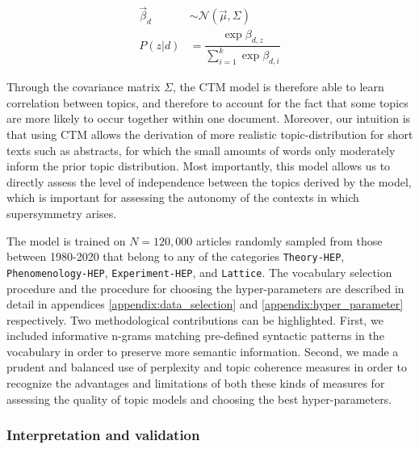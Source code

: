\documentclass[smallextended]{svjour3}
\begin{document}
\begin{align}
    \label{eq:ctm_prior}
    \vec{\beta}_{d} &\sim \mathcal{N}(\vec{\mu}, \Sigma) \\
    P(z|d) &= \dfrac{\exp \beta_{d,z}}{\sum_{i=1}^k \exp \beta_{d,i}}
\end{align}

Through the covariance matrix $\Sigma$, the CTM model is therefore able to learn correlation between topics, and therefore to account for the fact that some topics are more likely to occur together within one document. %
Moreover, our intuition is that using CTM allows the derivation of more realistic topic-distribution for short texts such as abstracts, for which the small amounts of words only moderately inform the prior topic distribution. Most importantly, this model allows us to directly assess the level of independence between the topics derived by the model, which is important for assessing the autonomy of the contexts in which supersymmetry arises.

The model is trained on $N=120,000$ articles randomly sampled from those between 1980-2020 that belong to any of the categories \texttt{Theory-HEP}, \texttt{Phenomenology-HEP}, \texttt{Experiment-HEP}, and \texttt{Lattice}. The vocabulary selection procedure and the procedure for choosing the hyper-parameters are described in detail in appendices \ref{appendix:data_selection} and \ref{appendix:hyper_parameter} respectively. Two methodological contributions can be highlighted. First, we included informative n-grams matching pre-defined syntactic patterns in the vocabulary in order to preserve more semantic information. Second, we made a prudent and balanced use of perplexity and topic coherence measures in order to recognize the advantages and limitations of both these kinds of measures for assessing the quality of topic models and choosing the best hyper-parameters.

\subsubsection{Interpretation and validation}
\end{document}
